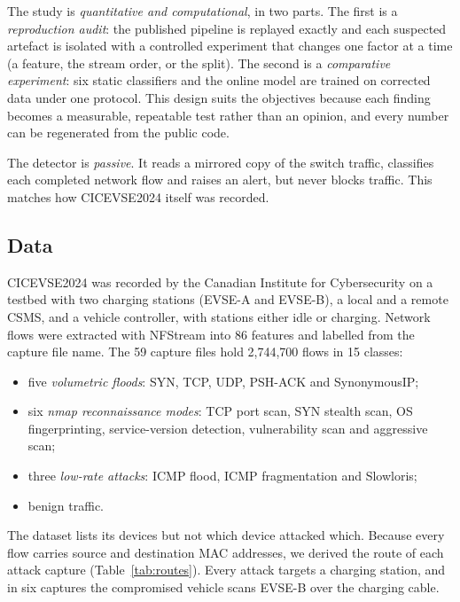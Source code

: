 \documentclass[preprint,12pt]{elsarticle}
\begin{document}
The study is \emph{quantitative and computational}, in two parts. The first is a \emph{reproduction audit}: the published pipeline is replayed exactly and each suspected artefact is isolated with a controlled experiment that changes one factor at a time (a feature, the stream order, or the split). The second is a \emph{comparative experiment}: six static classifiers and the online model are trained on corrected data under one protocol. This design suits the objectives because each finding becomes a measurable, repeatable test rather than an opinion, and every number can be regenerated from the public code.

The detector is \emph{passive}. It reads a mirrored copy of the switch traffic, classifies each completed network flow and raises an alert, but never blocks traffic. This matches how CICEVSE2024 itself was recorded.

\subsection{Data}

CICEVSE2024 \cite{b8} was recorded by the Canadian Institute for Cybersecurity on a testbed with two charging stations (EVSE-A and EVSE-B), a local and a remote CSMS, and a vehicle controller, with stations either idle or charging. Network flows were extracted with NFStream into 86 features and labelled from the capture file name. The 59 capture files hold 2,744,700 flows in 15 classes:
\begin{itemize}
    \item five \emph{volumetric floods}: SYN, TCP, UDP, PSH-ACK and SynonymousIP;
    \item six \emph{nmap reconnaissance modes}: TCP port scan, SYN stealth scan, OS fingerprinting, service-version detection, vulnerability scan and aggressive scan;
    \item three \emph{low-rate attacks}: ICMP flood, ICMP fragmentation and Slowloris;
    \item benign traffic.
\end{itemize}

The dataset lists its devices but not which device attacked which. Because every flow carries source and destination MAC addresses, we derived the route of each attack capture (Table~\ref{tab:routes}). Every attack targets a charging station, and in six captures the compromised vehicle scans EVSE-B over the charging cable.
\end{document}
